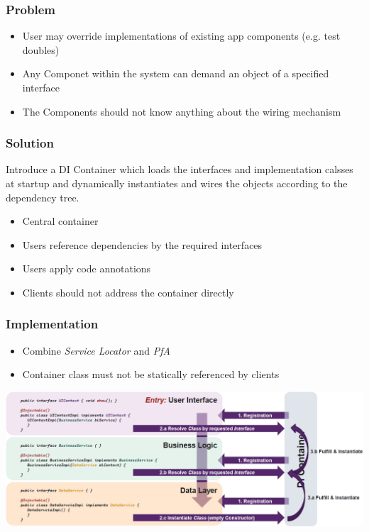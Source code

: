 \subsubsection{Problem}
\begin{itemize}
    \item User may override implementations of existing app components (e.g. test doubles)
    \item Any Componet within the system can demand an object of a specified interface
    \item The Components should not know anything about the wiring mechanism
\end{itemize}
\subsubsection{Solution}
Introduce a DI Container which loads the interfaces and implementation calsses at startup and dynamically instantiates and wires the objects according to the dependency tree.
\begin{itemize}
    \item Central container
    \item Users reference dependencies by the required interfaces
    \item Users apply code annotations 
    \item Clients should not address the container directly
\end{itemize}
\subsubsection{Implementation}
\begin{itemize}
    \item Combine \textit{Service Locator} and \textit{PfA}
    \item Container class must not be statically referenced by clients
\end{itemize}
\includegraphics[width=\linewidth]{./img/di_impl.png}
